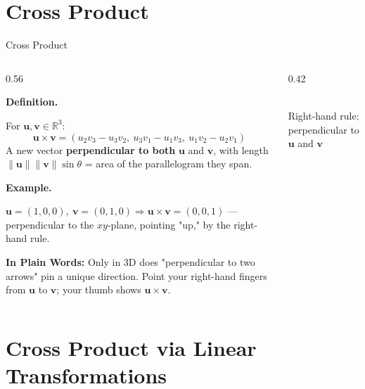 \documentclass[9pt,aspectratio=169]{beamer}
\newcommand{\childex}[1]{%
\par\medskip\noindent\textbf{In Plain Words:} #1\par\medskip}
\begin{document}
\section{Cross Product}

\begin{frame}{Cross Product}
\footnotesize
\begin{columns}[T]
\begin{column}{0.56\textwidth}
\par\noindent\textbf{Definition.}\par
For $\mathbf{u},\mathbf{v}\in\mathbb{R}^3$:
\[
\mathbf{u}\times\mathbf{v} =
\left(u_2v_3-u_3v_2,\ u_3v_1-u_1v_3,\ u_1v_2-u_2v_1\right)
\]
A new vector \textbf{perpendicular to both} $\mathbf{u}$ and $\mathbf{v}$, with length
$\|\mathbf{u}\|\|\mathbf{v}\|\sin\theta$ = area of the parallelogram they span.
\medskip

\par\noindent\textbf{Example.}\par
$\mathbf{u}=(1,0,0),\ \mathbf{v}=(0,1,0) \Rightarrow \mathbf{u}\times\mathbf{v}=(0,0,1)$
--- perpendicular to the $xy$-plane, pointing "up," by the right-hand rule.
\medskip

\childex{Only in 3D does "perpendicular to two arrows" pin a unique direction. Point your
right-hand fingers from $\mathbf{u}$ to $\mathbf{v}$; your thumb shows
$\mathbf{u}\times\mathbf{v}$.}
\end{column}
\begin{column}{0.42\textwidth}
\centering
{}
\\[0.3em]{\scriptsize Right-hand rule: perpendicular to $\mathbf{u}$ and $\mathbf{v}$}
\end{column}
\end{columns}
\end{frame}

\section{Cross Product via Linear Transformations}
\end{document}

